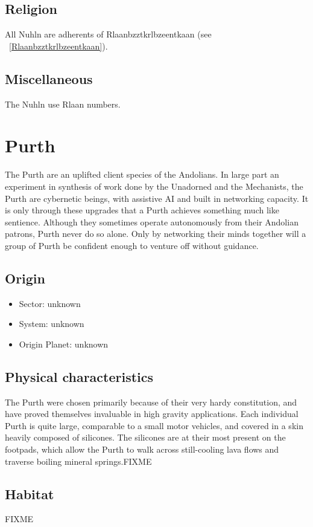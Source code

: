 \subsection{Religion}
All Nuhln are adherents of Rlaanbzztkrlbzeentkaan (see ~\ref{Rlaanbzztkrlbzeentkaan}). 

\subsection{Miscellaneous}
The Nuhln use Rlaan numbers. 

\section{Purth}

The Purth are an uplifted client species of the Andolians. In large
part an experiment in synthesis of work done by the Unadorned and the
Mechanists, the Purth are cybernetic beings, with assistive AI and
built in networking capacity. It is only through these upgrades that a
Purth achieves something much like sentience.  Although they sometimes
operate autonomously from their Andolian patrons, Purth never do so
alone. Only by networking their minds together will a group of Purth
be confident enough to venture off without guidance.

\subsection{Origin}
\begin{itemize}
\item Sector: unknown
\item System: unknown
\item Origin Planet: unknown
\end{itemize}

\subsection{Physical characteristics}
The Purth were chosen primarily because of their very hardy
constitution, and have proved themselves invaluable in high gravity
applications. Each individual Purth is quite large, comparable to a
small motor vehicles, and covered in a skin heavily composed of
silicones. The silicones are at their most present on the footpads,
which allow the Purth to walk across still-cooling lava flows and
traverse boiling mineral springs.FIXME

\subsection{Habitat}
FIXME 

